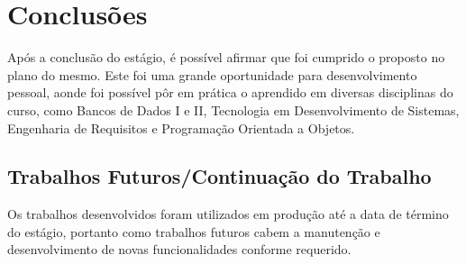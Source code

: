 
\chapter{Conclusões} \label{cap:concl}

Após a conclusão do estágio, é possível afirmar que foi cumprido o proposto no plano do mesmo. Este foi uma grande oportunidade para desenvolvimento pessoal, aonde foi possível pôr em prática o aprendido em diversas disciplinas do curso, como Bancos de Dados I e II, Tecnologia em Desenvolvimento de Sistemas, Engenharia de Requisitos e Programação Orientada a Objetos.

\section{Trabalhos Futuros/Continuação do Trabalho}

Os trabalhos desenvolvidos foram utilizados em produção até a data de término do estágio, portanto como trabalhos futuros cabem a manutenção e desenvolvimento de novas funcionalidades conforme requerido.